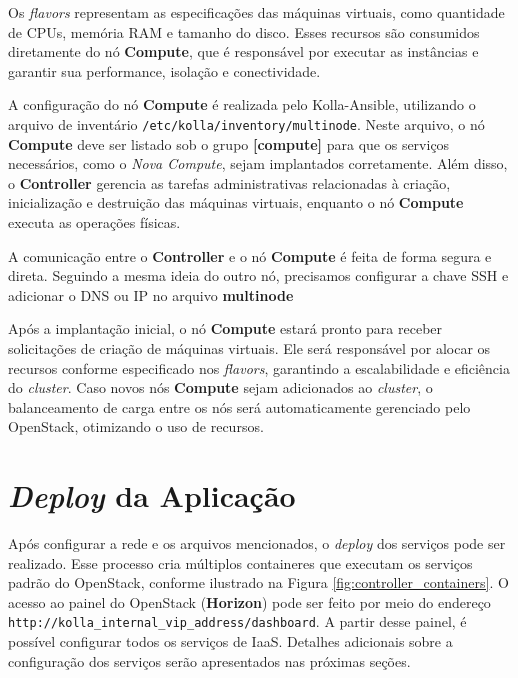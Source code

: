 Os \textit{flavors} representam as especificações das máquinas virtuais, como quantidade de CPUs, memória RAM e tamanho do disco. Esses recursos são consumidos diretamente do nó \textbf{Compute}, que é responsável por executar as instâncias e garantir sua performance, isolação e conectividade.

A configuração do nó \textbf{Compute} é realizada pelo Kolla-Ansible, utilizando o arquivo de inventário \texttt{/etc/kolla/inventory/multinode}. Neste arquivo, o nó \textbf{Compute} deve ser listado sob o grupo \textbf{[compute]} para que os serviços necessários, como o \textit{Nova Compute}, sejam implantados corretamente. Além disso, o \textbf{Controller} gerencia as tarefas administrativas relacionadas à criação, inicialização e destruição das máquinas virtuais, enquanto o nó \textbf{Compute} executa as operações físicas.

A comunicação entre o \textbf{Controller} e o nó \textbf{Compute} é feita de forma segura e direta. Seguindo a mesma ideia do outro nó, precisamos configurar a chave SSH e adicionar o DNS ou IP no arquivo \textbf{multinode}

Após a implantação inicial, o nó \textbf{Compute} estará pronto para receber solicitações de criação de máquinas virtuais. Ele será responsável por alocar os recursos conforme especificado nos \textit{flavors}, garantindo a escalabilidade e eficiência do \textit{cluster}. Caso novos nós \textbf{Compute} sejam adicionados ao \textit{cluster}, o balanceamento de carga entre os nós será automaticamente gerenciado pelo OpenStack, otimizando o uso de recursos.


\section{\textit{Deploy} da Aplicação}
Após configurar a rede e os arquivos mencionados, o \textit{deploy} dos serviços pode ser realizado. Esse processo cria múltiplos containeres que executam os serviços padrão do OpenStack, conforme ilustrado na Figura \ref{fig:controller_containers}. O acesso ao painel do OpenStack (\textbf{Horizon}) pode ser feito por meio do endereço \texttt{http://kolla\_internal\_vip\_address/dashboard}. A partir desse painel, é possível configurar todos os serviços de IaaS. Detalhes adicionais sobre a configuração dos serviços serão apresentados nas próximas seções.


